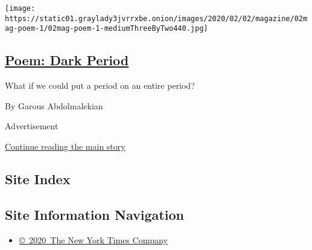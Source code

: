 \begin{enumerate}
  \texttt{[image: https://static01.graylady3jvrrxbe.onion/images/2020/02/02/magazine/02mag-poem-1/02mag-poem-1-mediumThreeByTwo440.jpg]}

  \hypertarget{poem-dark-period}{%
  \subsection{\texorpdfstring{\href{/2020/01/30/magazine/poem-dark-period.html}{Poem:
  Dark Period}}{Poem: Dark Period}}\label{poem-dark-period}}

  What if we could put a period on an entire period?

  By Garous Abdolmalekian
\end{enumerate}

Advertisement

\protect\hyperlink{after-mid1}{Continue reading the main story}

\hypertarget{site-index}{%
\subsection{Site Index}\label{site-index}}

\hypertarget{site-information-navigation}{%
\subsection{Site Information
Navigation}\label{site-information-navigation}}

\begin{itemize}
\tightlist
\item
  \href{https://help.nytimes3xbfgragh.onion/hc/en-us/articles/115014792127-Copyright-notice}{©~2020~The
  New York Times Company}
\end{itemize}

